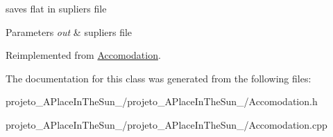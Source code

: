 saves flat in supliers file 


\begin{DoxyParams}{Parameters}
{\em out} & supliers file \\
\hline
\end{DoxyParams}


Reimplemented from \hyperlink{class_accomodation_a4394eb907b2d5a23faf73dd03c1dac4d}{Accomodation}.



The documentation for this class was generated from the following files\+:\begin{DoxyCompactItemize}
\item 
projeto\+\_\+\+A\+Place\+In\+The\+Sun\+\_/projeto\+\_\+\+A\+Place\+In\+The\+Sun\+\_/Accomodation.\+h\item 
projeto\+\_\+\+A\+Place\+In\+The\+Sun\+\_/projeto\+\_\+\+A\+Place\+In\+The\+Sun\+\_/Accomodation.\+cpp\end{DoxyCompactItemize}
